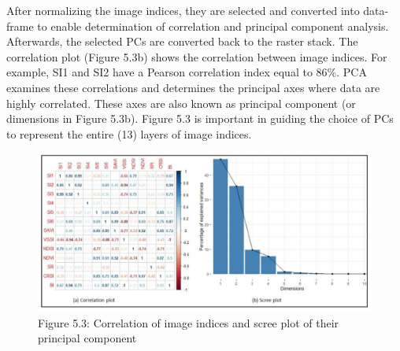 \documentclass[
  10pt,
  b5paper,
]{book}
\newenvironment{Shaded}{\begin{snugshade}}{\end{snugshade}}
\newcommand{\CommentTok}[1]{\textcolor[rgb]{0.56,0.35,0.01}{\textit{#1}}}
\newcommand{\DataTypeTok}[1]{\textcolor[rgb]{0.13,0.29,0.53}{#1}}
\newcommand{\FloatTok}[1]{\textcolor[rgb]{0.00,0.00,0.81}{#1}}
\newcommand{\KeywordTok}[1]{\textcolor[rgb]{0.13,0.29,0.53}{\textbf{#1}}}
\newcommand{\NormalTok}[1]{#1}
\newcommand{\OperatorTok}[1]{\textcolor[rgb]{0.81,0.36,0.00}{\textbf{#1}}}
\newcommand{\OtherTok}[1]{\textcolor[rgb]{0.56,0.35,0.01}{#1}}
\newcommand{\StringTok}[1]{\textcolor[rgb]{0.31,0.60,0.02}{#1}}
\begin{document}
\begin{Shaded}
\end{Shaded}

After normalizing the image indices, they are selected and converted into data-frame to enable determination of correlation and principal component analysis. Afterwards, the selected PCs are converted back to the raster stack.
The correlation plot (Figure 5.3b) shows the correlation between image indices. For example, SI1 and SI2 have a Pearson correlation index equal to 86\%. PCA examines these correlations and determines the principal axes where data are highly correlated. These axes are also known as principal component (or dimensions in Figure 5.3b). Figure 5.3 is important in guiding the choice of PCs to represent the entire (13) layers of image indices.

\begin{figure}
\centering
\includegraphics{figures/images/Figure5.3.PNG}
\caption{Figure 5.3: Correlation of image indices and scree plot of their principal component}
\end{figure}
\end{document}
